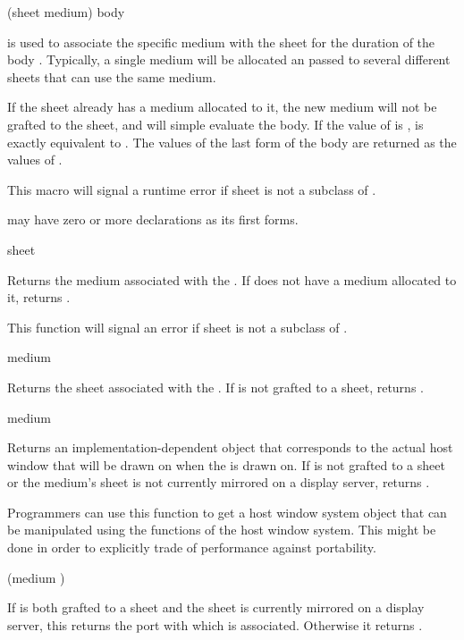  {(sheet medium) \body body}

 is used to associate the specific medium
 with the sheet  for the duration of the body .
Typically, a single medium will be allocated an passed to several different
sheets that can use the same medium.

If the sheet already has a medium allocated to it, the new medium will not be
grafted to the sheet, and  will simple evaluate the
body.  If the value of  is ,  is
exactly equivalent to .  The values of the last form of
the body are returned as the values of .

This macro will signal a runtime error if sheet is not a subclass of
.

 may have zero or more declarations as its first forms.

 {sheet}

Returns the medium associated with the  .  If 
does not have a medium allocated to it,  returns .

This function will signal an error if sheet is not a subclass of
.

 {medium}

Returns the sheet associated with the  .  If
 is not grafted to a sheet,  returns .

 {medium}

Returns an implementation-dependent object that corresponds to the actual host
window that will be drawn on when the   is drawn on.
If  is not grafted to a sheet or the medium's sheet is not currently
mirrored on a display server,  returns .

Programmers can use this function to get a host window system object that can be
manipulated using the functions of the host window system.  This might be done
in order to explicitly trade of performance against portability.

 {(medium )}

If  is both grafted to a sheet and the sheet is currently mirrored
on a display server, this returns the port with which  is
associated.  Otherwise it returns .

